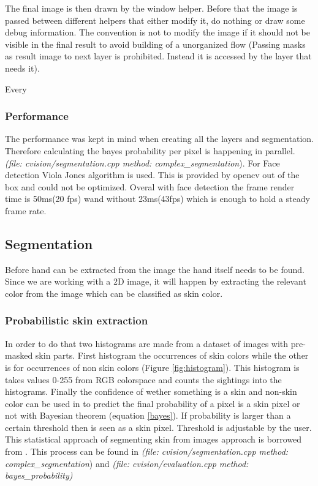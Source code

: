 \documentclass[11pt,a4paper]{article}
\begin{document}
The final image is then drawn by the window helper. Before that the image is passed between different helpers that either modify it, do nothing or draw some debug information. The convention is not to modify the image if it should not be visible in the final result to avoid building of a unorganized flow (Passing masks as result image to next layer is prohibited. Instead it is accessed by the layer that needs it). \bigskip

Every

\subsubsection{Performance}
The performance was kept in mind when creating all the layers and segmentation. Therefore calculating the bayes probability per pixel is happening in parallel. \textit{(file: cvision/segmentation.cpp method: complex\_segmentation}). For Face detection Viola Jones algorithm is used. This is provided by opencv out of the box and could not be optimized. Overal with face detection the frame render time is 50ms(20 fps) wand without 23ms(43fps) which is enough to hold a steady frame rate.

\subsection{Segmentation}
Before hand can be extracted from the image the hand itself needs to be found. Since we are working with a 2D image, it will happen by extracting the relevant color from the image which can be classified as skin color.

\subsubsection{Probabilistic skin extraction}
In order to do that two histograms are made from a dataset of images with pre-masked skin parts. First histogram the occurrences of skin colors while the other is for occurrences of non skin colors (Figure \ref{fig:histogram}). This histogram is takes values 0-255 from RGB colorspace \citep{Jones2002} and counts the sightings into the histograms. Finally the confidence of wether something is a skin and non-skin color can be used in to predict the final probability of a pixel is a skin pixel or not with Bayesian theorem (equation \ref{bayes}). If probability is larger than a certain threshold then is seen as a skin pixel. Threshold is adjustable by the user. This statistical approach of segmenting skin from images approach is borrowed from \citet{Jones2002}. This process can be found in \textit{(file: cvision/segmentation.cpp method: complex\_segmentation}) and \textit{(file: cvision/evaluation.cpp method: bayes\_probability)}
\end{document}
